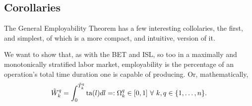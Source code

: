 \documentclass[hidelinks, nonatbib]{elsarticle}
\begin{document}
\subsection{Corollaries}
The General Employability Theorem has a few interesting collolaries, the first, and simplest, of which is a more compact, and intuitive, version of it.
\begin{corollary}
    We want to show that, as with the BET and ISL, so too in a maximally and monotonically stratified labor market, employability is the percentage of an operation's total time duration one is capable of producing. Or, mathematically,
    \begin{gather}
        \tilde{W}_{k}^{q}
        =
        \int_{0}^{\tilde{T}_{k}^{q}}
        \text{ta}(l)
        dl
        =:
        \Omega_{k}^{q}
        \in 
        [0,1]
        \
        \forall
        \
        k,q \in \{1, \dots, n\}
        .
    \end{gather}


\end{corollary}
\end{document}
